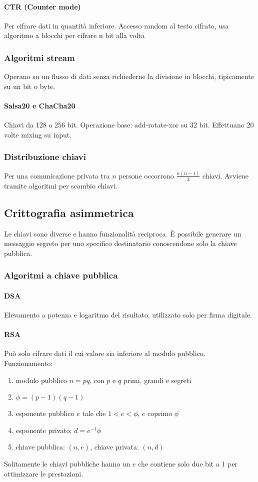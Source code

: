\documentclass[11pt]{article}
\begin{document}
\paragraph*{CTR (Counter mode)}
Per cifrare dati in quantità inferiore. Accesso random al testo cifrato, usa algoritmo a blocchi per cifrare n bit alla 
volta
\subsubsection{Algoritmi stream}
Operano su un flusso di dati senza richiederne la divisione in blocchi, tipicamente su un bit o byte.
\paragraph*{Salsa20 e ChaCha20}
Chiavi da 128 o 256 bit. Operazione base: add-rotate-xor su 32 bit. Effettuano 20 volte mixing su input.
\subsubsection{Distribuzione chiavi}
Per una comunicazione privata tra $n$ persone occorrono $\frac{n(n-1)}{2}$ chiavi. Avviene tramite algoritmi per scambio
chiavi.
\subsection{Crittografia asimmetrica}
Le chiavi sono diverse e hanno funzionalità reciproca. È possibile generare un messaggio segreto per uno specifico destinatario 
conoscendone solo la chiave pubblica.
\subsubsection{Algoritmi a chiave pubblica}
\paragraph*{DSA}
Elevamento a potenza e logaritmo del risultato, utilizzato solo per firma digitale.
\paragraph*{RSA}
Può solo cifrare dati il cui valore sia inferiore al modulo pubblico. Funzionamento:
\begin{enumerate}
    \item modulo pubblico $n=pq$, con $p$ e $q$ primi, grandi e segreti
    \item $\phi=(p-1)(q-1)$
    \item esponente pubblico $e$ tale che $1<e<\phi$, $e$ coprimo $\phi$
    \item esponente privato: $d=e^{-1}\phi$
    \item chiave pubblica: $(n,e)$, chiave privata: $(n,d)$
\end{enumerate}
Solitamente le chiavi pubbliche hanno un $e$ che contiene solo due bit a 1 per ottimizzare le prestazioni.
\end{document}
